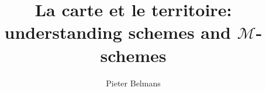 \documentclass[11pt, a4paper, openany, oneside, article]{memoir}
\begin{document}
\title{La carte et le territoire: understanding schemes and $\mathcal{M}$-schemes}
\author{Pieter Belmans}
\maketitle
\tableofcontents*

\clearpage

\clearpage

\clearpage

\clearpage

\clearpage

\clearpage



\end{document}
